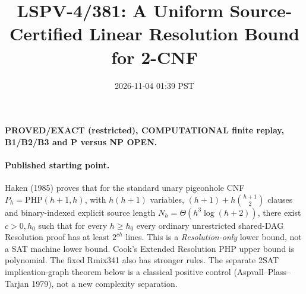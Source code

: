 \documentclass{article}
\title{LSPV-4/381: A Uniform Source-Certified Linear Resolution Bound for 2-CNF}
\date{2026-11-04 01:39 PST}
\begin{document}
\maketitle
\noindent\textbf{PROVED/EXACT (restricted), COMPUTATIONAL finite replay, B1/B2/B3 and P versus NP OPEN.}

\paragraph{Published starting point.} Haken (1985) proves that for the standard unary pigeonhole CNF $P_h=\mathrm{PHP}(h+1,h)$, with $h(h+1)$ variables, $(h+1)+h\binom{h+1}{2}$ clauses and binary-indexed explicit source length $N_h=\Theta(h^3\log(h+2))$, there exist $c>0,h_0$ such that for every $h\ge h_0$ every ordinary unrestricted shared-DAG Resolution proof has at least $2^{ch}$ lines. This is a \emph{Resolution-only} lower bound, not a SAT machine lower bound. Cook's Extended Resolution PHP upper bound is polynomial. The fixed Rmix341 also has stronger rules. The separate 2SAT implication-graph theorem below is a classical positive control (Aspvall--Plass--Tarjan 1979), not a new complexity separation.
\end{document}
